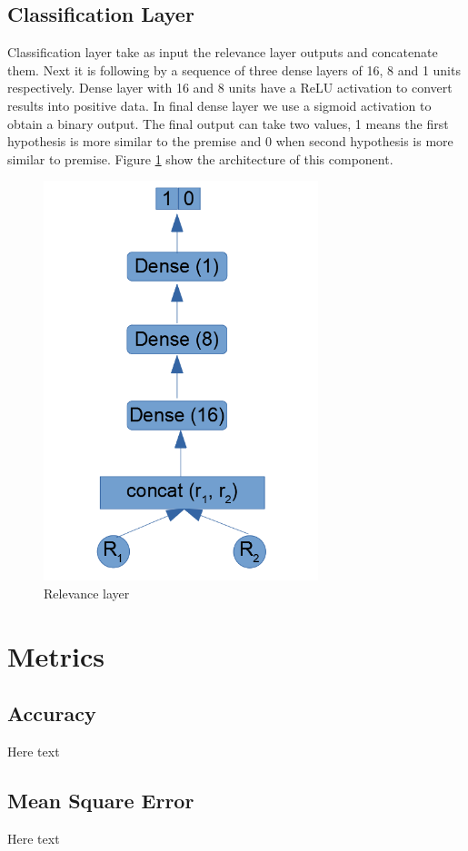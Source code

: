 \documentclass[12pt]{report}
\begin{document}
\subsection{Classification Layer}

Classification layer take as input the relevance layer outputs and concatenate them. Next it is following by a sequence of three dense layers of 16, 8 and 1 units respectively. Dense layer with 16 and 8 units have a \ac{ReLU} activation to convert results into positive data. In final dense layer we use a sigmoid activation to obtain a binary output. The final output can take two values, 1 means the first hypothesis is more similar to the premise and 0 when second hypothesis is more similar to premise. Figure \ref{figure:classification} show the architecture of this component.

\begin{figure}[H]	
	\centering
	\includegraphics[width=80mm, scale = 1]{images/15_classification.png}	
	\caption{Relevance layer}	
	\label{figure:classification}
\end{figure}

\section{Metrics}
\subsection{Accuracy}
Here text
\subsection{Mean Square Error}
Here text
\end{document}
